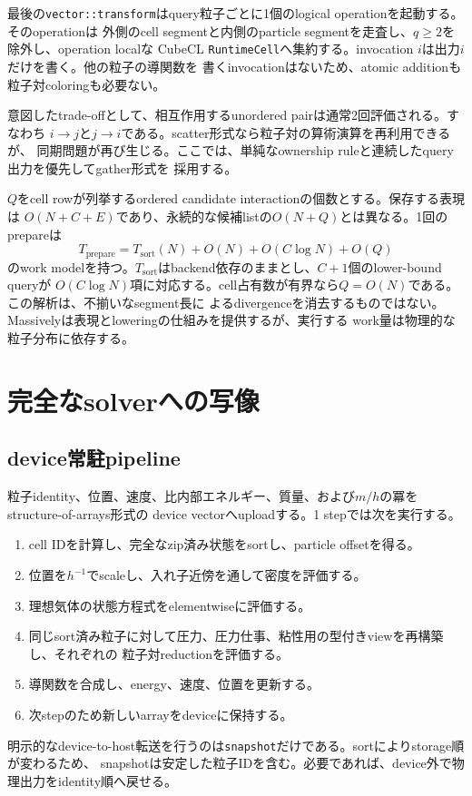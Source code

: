 \documentclass[a4paper,10pt]{ltjsarticle}
\newcommand{\code}[1]{\texttt{#1}}
\begin{document}
最後の\code{vector::transform}はquery粒子ごとに1個のlogical operationを起動する。そのoperationは
外側のcell segmentと内側のparticle segmentを走査し、$q\ge2$を除外し、operation localな
CubeCL \code{RuntimeCell}へ集約する。invocation $i$は出力$i$だけを書く。他の粒子の導関数を
書くinvocationはないため、atomic additionも粒子対coloringも必要ない。

意図したtrade-offとして、相互作用するunordered pairは通常2回評価される。すなわち
$i\mathbin{\to}j$と$j\mathbin{\to}i$である。scatter形式なら粒子対の算術演算を再利用できるが、
同期問題が再び生じる。ここでは、単純なownership ruleと連続したquery出力を優先してgather形式を
採用する。

$Q$をcell rowが列挙するordered candidate interactionの個数とする。保存する表現は
$O(N+C+E)$であり、永続的な候補listの$O(N+Q)$とは異なる。1回のprepareは
\begin{equation}
 T_{\mathrm{prepare}}=
 T_{\mathrm{sort}}(N)+O(N)+O(C\log N)+O(Q)
 \label{eq:cost-ja}
\end{equation}
のwork modelを持つ。$T_{\mathrm{sort}}$はbackend依存のままとし、$C+1$個のlower-bound queryが
$O(C\log N)$項に対応する。cell占有数が有界なら$Q=O(N)$である。この解析は、不揃いなsegment長に
よるdivergenceを消去するものではない。Massivelyは表現とloweringの仕組みを提供するが、実行する
work量は物理的な粒子分布に依存する。

\section{完全なsolverへの写像}
\label{sec:whole-solver-ja}

\subsection{device常駐pipeline}

粒子identity、位置、速度、比内部エネルギー、質量、および$m/h$の冪をstructure-of-arrays形式の
device vectorへuploadする。1 stepでは次を実行する。
\begin{enumerate}
  \item cell IDを計算し、完全なzip済み状態をsortし、particle offsetを得る。
  \item 位置を$h^{-1}$でscaleし、入れ子近傍を通して密度を評価する。
  \item 理想気体の状態方程式をelementwiseに評価する。
  \item 同じsort済み粒子に対して圧力、圧力仕事、粘性用の型付きviewを再構築し、それぞれの
        粒子対reductionを評価する。
  \item 導関数を合成し、energy、速度、位置を更新する。
  \item 次stepのため新しいarrayをdeviceに保持する。
\end{enumerate}
明示的なdevice-to-host転送を行うのは\code{snapshot}だけである。sortによりstorage順が変わるため、
snapshotは安定した粒子IDを含む。必要であれば、device外で物理出力をidentity順へ戻せる。
\end{document}
